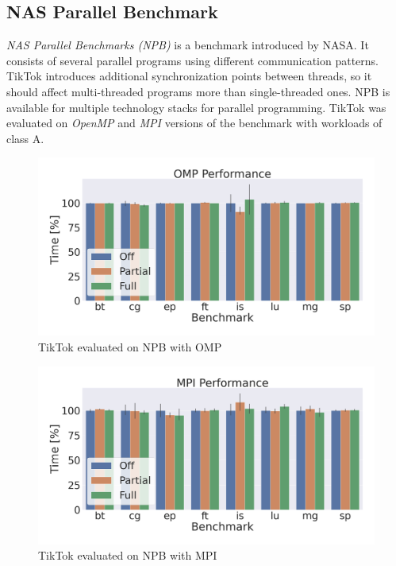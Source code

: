 \documentclass[conference]{IEEEtran}
\newcommand{\sysname}{TikTok}
\begin{document}
\subsection{NAS Parallel Benchmark}
\label{subsec:npb}

\emph{NAS Parallel Benchmarks (NPB)} is a benchmark introduced by NASA. It
consists of several parallel programs using different communication patterns.
\sysname{} introduces additional synchronization points between threads, so it
should affect multi-threaded programs more than single-threaded ones. NPB is
available for multiple technology stacks for parallel programming. \sysname{}
was evaluated on \emph{OpenMP} and \emph{MPI} versions of the benchmark
with workloads of class A.

\begin{figure}[]
  \centering
  \includegraphics[width=\linewidth]{graphs/omp.png}
  \caption{\sysname{} evaluated on NPB with OMP}
  \label{fig:npbomp}
\end{figure}

\begin{figure}[]
  \centering
  \includegraphics[width=\linewidth]{graphs/mpi.png}
  \caption{\sysname{} evaluated on NPB with MPI}
  \label{fig:npbmpi}
\end{figure}
\end{document}
